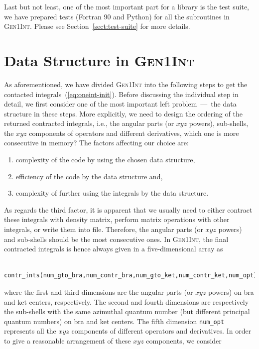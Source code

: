\documentclass[a4paper,11pt,twoside,openright]{book}
\begin{document}
Last but not least, one of the most important part for a library is the test suite, we have prepared tests
(Fortran 90 and Python) for all the subroutines in \textsc{Gen1Int}. Please see Section~\ref{sect:test-suite}
for more details.

\section{Data Structure in \textsc{Gen1Int}}
\label{sect:data-structure}

As aforementioned, we have divided \textsc{Gen1Int} into the following steps to get the contacted
integrals~(\ref{eq:oneint-init}). Before discussing the individual step in detail, we first consider one
of the most important left problem~---~the data structure in these steps. More explicitly, we need to
design the ordering of the returned contracted integrals, i.e., the angular parts (or $xyz$ powers),
sub-shells, the $xyz$ components of operators and different derivatives, which one is more
consecutive in memory? The factors affecting our choice are:
\begin{enumerate}
  \item complexity of the code by using the chosen data structure,
  \item efficiency of the code by the data structure and,
  \item complexity of further using the integrals by the data structure.
\end{enumerate}
As regards the third factor, it is apparent that we usually need to either contract these integrals with
density matrix, perform matrix operations with other integrals, or write them into file. Therefore,
the angular parts (or $xyz$ powers) and sub-shells should be the most consecutive ones. In \textsc{Gen1Int},
the final contracted integrals is hence always given in a five-dimensional array as
\begin{verbatim}
    contr_ints(num_gto_bra,num_contr_bra,num_gto_ket,num_contr_ket,num_opt)
\end{verbatim}
where the first and third dimensions are the angular parts (or $xyz$ powers) on bra and ket centers,
respectively. The second and fourth dimensions are respectively the sub-shells with the same
azimuthal quantum number (but different principal quantum numbers) on bra and ket centers.
The fifth dimension \verb|num_opt| represents all the $xyz$ components of different operators and
derivatives. In order to give a reasonable arrangement of these $xyz$ components, we consider
\end{document}
